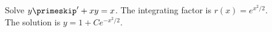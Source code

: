 {Solve $y\primeskip' + xy = x$.}
{The integrating factor is $r(x)=e^{x^2/2}$. \\
The solution is $y=1+Ce^{-x^2/2}$.}